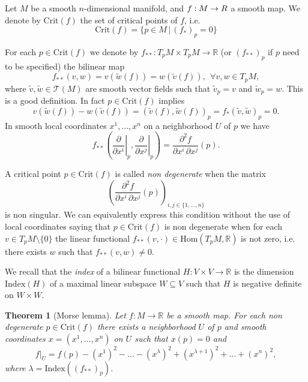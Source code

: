 \documentclass[12pt]{article}
\newtheorem{thm}{Theorem}
\newcommand{\Hom}[2]{\mathrm{Hom}(#1,#2)}
\newcommand{\R}{\mathbb{R}}
\begin{document}
\newcommand{\criti}{\mathrm{Crit}}
\newcommand{\inde}{\mathrm{Index}}
\newcommand{\deriv}[1]{\frac{\partial }{\partial #1}}
\newcommand{\dderiv}[3]{\frac{\partial^2 #1}{\partial #2\,\partial #3}}
\newcommand{\derivv}[2]{\left.\deriv{#1}\right|_{#2}}



Let    $M$ be a smooth $n$-dimensional manifold, and $f:M\rightarrow \mathbb \R$ a
smooth map. We denote by $\criti(f)$ the set of critical points of
$f$, i.e. $$\criti(f)=\{p\in M\,|\, (f_*)_p=0\}$$

For each $p\in \criti(f)$ we denote by $f_{**}:T_pM\times
T_pM\rightarrow\R$ (or $(f_{**})_p$ if $p$ need to be specified) the
bilinear map $$f_{**}(v,w)=v(\tilde w (f))=w(\tilde v (f)),\ \
\forall v,w\in T_pM,$$ where $\tilde v,\tilde w\in\mathcal T(M)$ are
smooth vector fields such that $\tilde v_p=v$ and $\tilde w_p=w$.
This is a good definition. In fact $p\in\criti(f)$ implies
$$v(\tilde w (f))-w(\tilde v (f))=(\tilde v (f),\tilde
w (f))_p=f_{*}(\tilde v,\tilde w)_p=0.$$ In smooth local coordinates
$x^1,...,x^n$ on a neighborhood $U$ of $p$ we have
$$f_{**}\left( \derivv{x^i}{p}, \derivv{x^j}{p}
\right)=\dderiv{f}{x^i}{x^j}(p).$$

A critical point $p\in\criti(f)$ is called \emph{non degenerate}
when the matrix $$\left( \dderiv{f}{x^i}{x^j}(p)
\right)_{i,j\in\{1,...,n\}}$$ is non singular. We can equivalently
express this condition without the use of local coordinates saying
that $p\in\criti(f)$ is non degenerate when for each $v\in T_p
M\setminus\{0\}$ the linear functional $f_{**}(v,\cdot)\in\Hom{T_pM}{\R}$
is not zero, i.e. there exists $w$ such that $f_{**}(v,w)\neq 0$.

We recall that the \emph{index} of a bilinear functional $H:V\times
V\rightarrow\R$ is the dimension $\inde(H)$ of a maximal linear
subspace $W\subseteq V$ such that $H$ is negative definite on
$W\times W$.

\begin{thm}[Morse lemma]
Let $f:M\rightarrow\R$ be a smooth map. For each non degenerate $p\in\criti(f)$ there exists a neighborhood $U$ of $p$ and smooth coordinates $x=(x^1,...,x^n)$ on $U$ such that $x(p)=0$ and
$$f|_U=f(p)-(x^1)^2-...-(x^\lambda)^2+(x^{\lambda+1})^2+...+(x^n)^2,$$
where $\lambda=\inde((f_{**})_p)$.
\end{thm}
\end{document}
